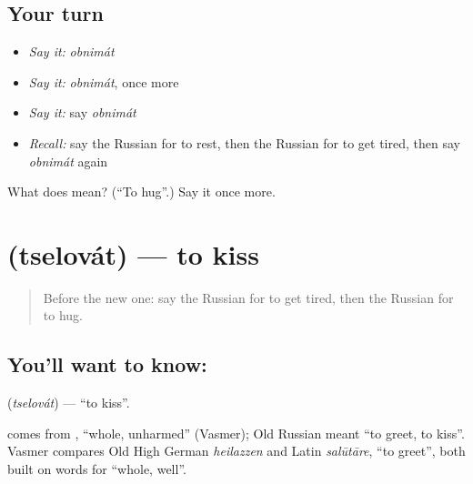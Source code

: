 \subsection*{Your turn}
\begin{itemize}
\raggedright
  \item \emph{Say it:} \emph{obnimát}
  \item \emph{Say it:} \emph{obnimát}, once more
  \item \emph{Say it:} say \emph{obnimát}
  \item \emph{Recall:} say the Russian for to rest, then the Russian for to get tired, then say \emph{obnimát} again
\end{itemize}

\begin{tcolorbox}[breakable,colback=teal!4,colframe=teal!35!black,title={Before you move on}]
What does  mean? (\textquotedblleft{}To hug\textquotedblright{}.) Say it once more.
\end{tcolorbox}
\section[\texorpdfstring{\ru{целовать} (tselovát)}{целовать (tselovát)}]{ (tselovát) — to kiss}

\label{lesson:RU-C177-tselovat}



\begin{quote}
Before the new one: say the Russian for to get tired, then the Russian for to hug.
\end{quote}

\subsection*{You'll want to know: }
\textbf{} (\emph{tselovát}) — \textquotedblleft{}to kiss\textquotedblright{}.

\begin{cousinweb}
\textbf{} comes from \emph{}, \textquotedblleft{}whole, unharmed\textquotedblright{} (Vasmer); Old Russian \emph{} meant \textquotedblleft{}to greet, to kiss\textquotedblright{}. Vasmer compares Old High German \emph{heilazzen} and Latin \emph{salūtāre}, \textquotedblleft{}to greet\textquotedblright{}, both built on words for \textquotedblleft{}whole, well\textquotedblright{}.
\end{cousinweb}

